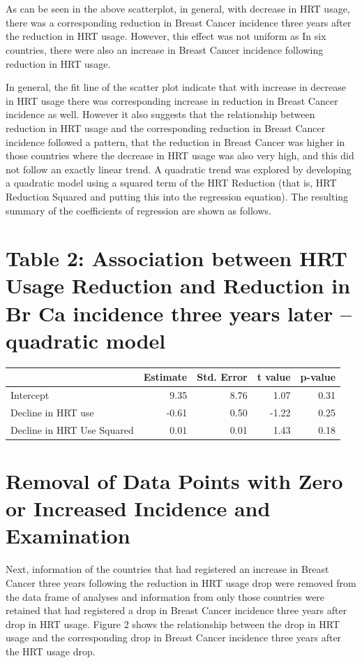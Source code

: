 \documentclass{article}
\begin{document}
\section*{}

As can be seen in the above scatterplot, in general, with decrease in HRT usage, there was a corresponding reduction in Breast Cancer incidence three years after the reduction in HRT usage. However, this effect was not uniform as In six countries, there were also an increase in Breast Cancer incidence following reduction in HRT usage. 

In general, the fit line of the scatter plot indicate that with increase in decrease in HRT usage there was corresponding increase in reduction in Breast Cancer incidence as well. However it also suggests that the relationship between reduction in HRT usage and the corresponding reduction in Breast Cancer incidence followed a pattern, that the reduction in Breast Cancer was higher in those countries where the decrease in HRT usage was also very high, and this did not follow an exactly linear trend. A quadratic trend was explored by developing a quadratic model using a squared term of the HRT Reduction (that is, HRT Reduction Squared and putting this into the regression equation). The resulting summary of the coefficients of regression are shown as follows.

\section*{Table 2: Association between HRT Usage Reduction and Reduction in Br Ca incidence three years later -- quadratic model}

\begin{tabular}{l|r|r|r|r}
\hline
  & Estimate & Std. Error & t value & p-value\\
\hline
Intercept & 9.35 & 8.76 & 1.07 & 0.31\\
\hline
Decline in HRT use & -0.61 & 0.50 & -1.22 & 0.25\\
\hline
Decline in HRT Use Squared & 0.01 & 0.01 & 1.43 & 0.18\\
\hline
\end{tabular}

\section*{Removal of Data Points with Zero or Increased Incidence and Examination}

Next, information of the countries that had registered an increase in Breast Cancer three years following the reduction in HRT usage drop were removed from the data frame of analyses and information from only those countries were retained that had registered a drop in Breast Cancer incidence three years after drop in HRT usage. Figure 2 shows the relationship between the drop in HRT usage and the corresponding drop in Breast Cancer incidence three years after the HRT usage drop. 
\end{document}
